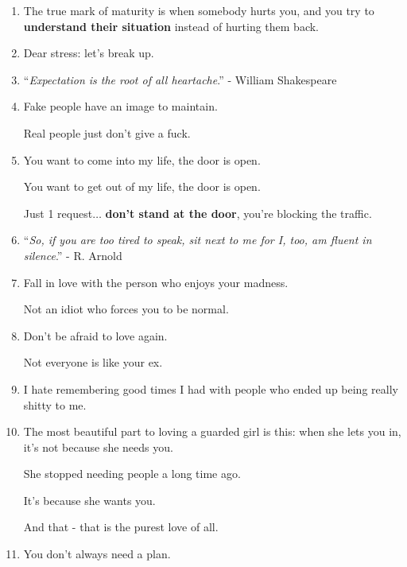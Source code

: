 \documentclass{article}
\numberwithin{equation}{section}
\begin{document}
\begin{enumerate}
    1 day, our children will see our pictures and ask: ``\textit{Who are these people?}''.
    
    And we will smile with invisible tears because a heart is touched with a strong word and you will say:
    
    ``\textit{It was them that I had the best days of my life with}.''
    \item The true mark of maturity is when somebody hurts you, and you try to \textbf{understand their situation} instead of hurting them back.
    \item Dear stress: let's break up.
    \item ``\textit{Expectation is the root of all heartache}.'' - William Shakespeare
    \item Fake people have an image to maintain.
    
    Real people just don't give a fuck.
    \item You want to come into my life, the door is open.
    
    You want to get out of my life, the door is open.
    
    Just 1 request$\ldots$ \textbf{don't stand at the door}, you're blocking the traffic.
    \item ``\textit{So, if you are too tired to speak, sit next to me for I, too, am fluent in silence}.'' - R. Arnold
    \item Fall in love with the person who enjoys your madness.
    
    Not an idiot who forces you to be normal.
    \item Don't be afraid to love again.
    
    Not everyone is like your ex.
    \item I hate remembering good times I had with people who ended up being really shitty to me.
    \item The most beautiful part to loving a guarded girl is this: when she lets you in, it's not because she needs you.
    
    She stopped needing people a long time ago.
    
    It's because she wants you.
    
    And that - that is the purest love of all.
    \item You don't always need a plan.
    

\end{enumerate}
\end{document}
